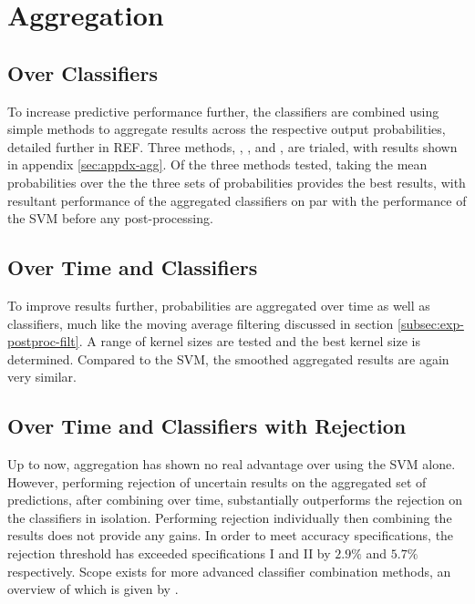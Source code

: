\section{Aggregation}
\label{sec:exp-agg}

    \subsection{Over Classifiers}
    \label{subsec:exp-agg-clf}
        To increase predictive performance further, the classifiers are combined using simple methods to aggregate results across the respective output probabilities, detailed further in REF. Three methods, , , and , are trialed, with results shown in appendix \ref{sec:appdx-agg}. Of the three methods tested, taking the mean probabilities over the the three sets of probabilities provides the best results, with resultant performance of the aggregated classifiers on par with the performance of the SVM before any post-processing. 
    
    \subsection{Over Time and Classifiers}
    \label{subsec:exp-agg-time}
        To improve results further, probabilities are aggregated over time as well as classifiers, much like the moving average filtering discussed in section \ref{subsec:exp-postproc-filt}. A range of kernel sizes are tested and the best kernel size is determined. Compared to the SVM, the smoothed aggregated results are again very similar.
        
    \subsection{Over Time and Classifiers with Rejection}
    \label{subsec:exp-agg-rej} 
        Up to now, aggregation has shown no real advantage over using the SVM alone. However, performing rejection of uncertain results on the aggregated set of predictions, after combining over time, substantially outperforms the rejection on the classifiers in isolation. Performing rejection individually then combining the results does not provide any gains. In order to meet accuracy specifications, the rejection threshold has exceeded specifications I and II by $2.9\%$ and $5.7\%$ respectively. Scope exists for more advanced classifier combination methods, an overview of which is given by \textcite{Suen2000}. 
